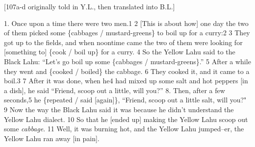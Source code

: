 \setcounter{footnote}{0}


[107a-d originally told in Y.L., then translated into B.L.]

1. Once upon a time there were two men.1 2 [This is about how] one day the two of
them picked some \{cabbages / mustard-greens\} to boil up for a curry:2 3 They
got up to the fields, and when noontime came the two of them were looking for [something
to] \{cook / boil up\} for a curry. 4 So the Yellow Lahu said to the Black Lahu:
``Let's go boil up some \{cabbages / mustard-greens\}.'' 5 After
a while they went and \{cooked / boiled\} the cabbage. 6 They cooked it, and it
came to a boil.3 7 After it was done, when he4 had mixed up some salt and hot peppers
[in a dish], he said ``Friend, scoop out a little, will you?''
8. Then, after a few seconds,5 he \{repeated / said [again]\}, ``Friend,
scoop out a little salt, will you?" 9 Now the way the Black Lahu said
it was because he didn't understand the Yellow Lahu dialect. 10 So that he [ended
up] making the Yellow Lahu scoop out some \textit{cabbage}. 11 Well, it was burning
hot, and the Yellow Lahu jumped--er, the Yellow Lahu ran away [in pain].

